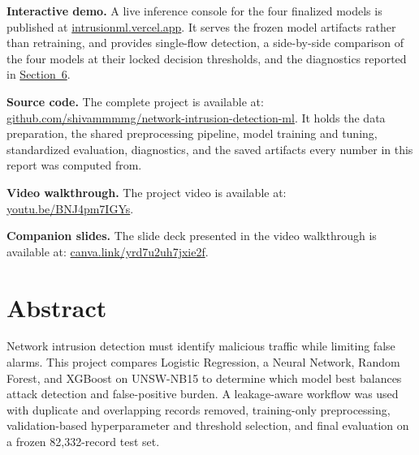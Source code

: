 \documentclass[
  canadian,
  12pt,
]{article}
\newif\ifshowcontents \showcontentstrue
\newif\ifshowlistoffigures \showlistoffiguresfalse
\newif\ifshowlistoftables \showlistoftablesfalse
\newif\ifshowdemoplate \showdemoplatetrue
\let\reportOrigSection\section
\renewcommand{\section}{\par\Needspace*{10\baselineskip}\reportOrigSection}%
\newif\ifreportTwoCol
\begin{document}
\fi

\ifreportTwoCol\onecolumn\fi
{}
\setcounter{page}{1}

\ifshowcontents\tableofcontents\fi

\vspace{2em}
{\renewcommand{\numberline}[1]{}%
\ifshowlistoffigures\listoffigures\fi
\ifshowlistoftables\vspace{2.5em}\listoftables\fi}

\ifshowdemoplate
\vfill
\begin{center}
\begin{tcolorbox}[enhanced, sharp corners, boxrule=0.5pt, colframe=black!55,
  colback=white, width=0.94\linewidth, left=10pt, right=10pt, top=8pt, bottom=8pt,
  fontupper=\footnotesize]
\raggedright
\textbf{Interactive demo.} A live inference console for the four finalized models is
published at \href{https://intrusionml.vercel.app/}{intrusionml.vercel.app}. It serves the
frozen model artifacts rather than retraining, and provides single-flow detection, a
side-by-side comparison of the four models at their locked decision thresholds, and the
diagnostics reported in \hyperref[sec-6]{Section~6}.

\medskip
\textbf{Source code.} The complete project is available at:
\href{https://github.com/shivammmmg/network-intrusion-detection-ml}{github.com/shivammmmg/network-intrusion-detection-ml}.
It holds the data preparation, the shared preprocessing pipeline, model training and
tuning, standardized evaluation, diagnostics, and the saved artifacts every number in this
report was computed from.

\medskip
\textbf{Video walkthrough.} The project video is available at:
\href{https://youtu.be/BNJ4pm7IGYs}{youtu.be/BNJ4pm7IGYs}.

\medskip
\textbf{Companion slides.} The slide deck presented in the video walkthrough is available at:
\href{https://canva.link/yrd7u2uh7jxie2f}{canva.link/yrd7u2uh7jxie2f}.
\end{tcolorbox}
\end{center}
\fi

\ifreportTwoCol\twocolumn\else\clearpage\fi
{}
\setcounter{page}{1}

\section{Abstract}\label{sec-abstract}

Network intrusion detection must identify malicious traffic while
limiting false alarms. This project compares Logistic Regression, a
Neural Network, Random Forest, and XGBoost on UNSW-NB15 to determine
which model best balances attack detection and false-positive burden. A
leakage-aware workflow was used with duplicate and overlapping records
removed, training-only preprocessing, validation-based hyperparameter
and threshold selection, and final evaluation on a frozen 82,332-record
test set.
\end{document}
